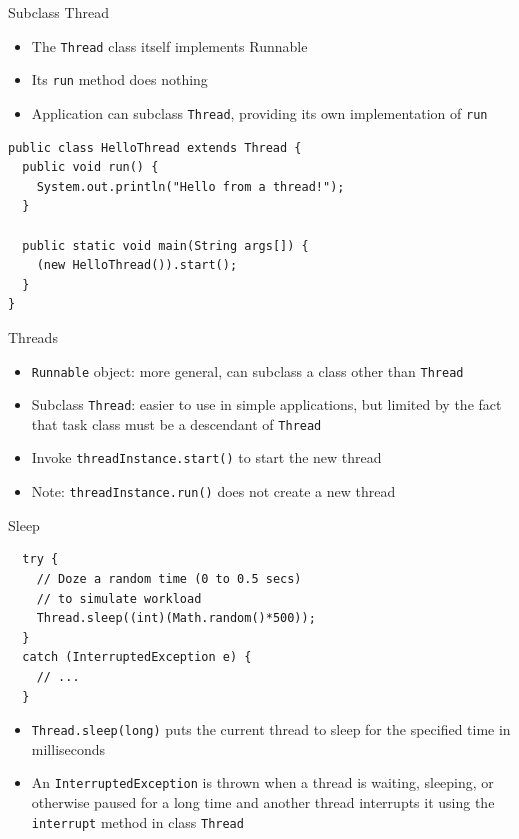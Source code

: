 \begin{frame}[fragile]{Subclass Thread}
  \begin{itemize}
  \item The \lstinline!Thread! class itself implements Runnable
  \item Its \lstinline!run! method does nothing
  \item Application can subclass \lstinline!Thread!, providing its own
    implementation of \lstinline!run!
  \end{itemize}


  \begin{lstlisting}
public class HelloThread extends Thread {
  public void run() {
    System.out.println("Hello from a thread!");
  }
  
  public static void main(String args[]) {
    (new HelloThread()).start();
  }  
}
  \end{lstlisting}
\end{frame}

\begin{frame}{Threads}
  \begin{itemize}
  \item \lstinline!Runnable! object: more general, can subclass a
    class other than \lstinline!Thread!
  \item Subclass \lstinline!Thread!: easier to use in simple
    applications, but limited by the fact that task class must be a
    descendant of \lstinline!Thread!
  \item Invoke \lstinline!threadInstance.start()! to start the new
    thread
  \item \alert{Note:} \lstinline!threadInstance.run()! does not create
    a new thread
  \end{itemize}
\end{frame}

\begin{frame}[fragile]{Sleep}
  \begin{lstlisting}
  try {	
    // Doze a random time (0 to 0.5 secs)	
    // to simulate workload	
    Thread.sleep((int)(Math.random()*500));
  } 
  catch (InterruptedException e) { 
    // ... 
  }  
  \end{lstlisting}


  \begin{itemize}
  \item \lstinline!Thread.sleep(long)! puts the current thread to
    sleep for the specified time in milliseconds
  \item An \lstinline!InterruptedException! is thrown when a thread is
    waiting, sleeping, or otherwise paused for a long time and another
    thread interrupts it using the \lstinline!interrupt! method in
    class \lstinline!Thread!
  \end{itemize}
\end{frame}

